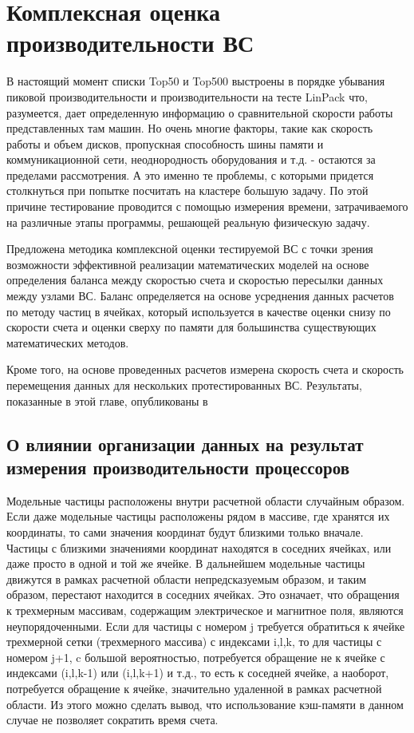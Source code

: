 \chapter{Комплексная оценка производительности ВС}



В настоящий момент списки Top50 и Top500
выстроены в порядке убывания пиковой производительности и производительности на тесте LinPack что, разумеется, дает определенную информацию
о сравнительной скорости работы представленных там машин. Но очень многие факторы, такие как скорость работы и объем дисков, пропускная 
способность шины памяти и коммуникационной сети, неоднородность оборудования и т.д. - остаются за пределами рассмотрения. А это именно те 
проблемы, с которыми придется столкнуться при попытке посчитать на кластере большую задачу. По этой причине тестирование проводится с помощью измерения времени, затрачиваемого на различные этапы программы, решающей реальную физическую задачу.




Предложена методика комплексной оценки тестируемой ВС с точки зрения возможности эффективной реализации математических моделей на основе определения баланса между скоростью счета и скоростью пересылки данных между узлами ВС. Баланс определяется на основе усреднения данных расчетов по методу частиц в ячейках, который используется в качестве оценки снизу по скорости счета и оценки сверху по памяти для большинства существующих математических методов.

Кроме того, на основе проведенных расчетов измерена скорость счета и скорость перемещения данных для нескольких протестированных ВС. Результаты, показанные в этой главе, опубликованы в \cite{VestnikNNSU,NumMethMultiLevel,SuperFrI,integrApproach}   

		


\section{О влиянии организации данных на результат измерения производительности процессоров}
\label{procs_influence}

Модельные частицы расположены внутри расчетной области случайным образом. Если даже модельные частицы расположены рядом в массиве, где хранятся их координаты,  то сами значения координат будут близкими только вначале. Частицы с близкими значениями координат находятся в соседних ячейках, или даже просто в одной и той же ячейке. В дальнейшем модельные частицы движутся в рамках расчетной области непредсказуемым образом, и таким образом, перестают находится в соседних ячейках. Это означает, что обращения к трехмерным массивам, содержащим электрическое и магнитное поля, являются неупорядоченными. Если для частицы с номером j требуется обратиться к ячейке трехмерной сетки (трехмерного массива) с индексами i,l,k, то для частицы с номером j+1, c большой вероятностью, потребуется обращение не к ячейке с индексами (i,l,k-1) или (i,l,k+1) и т.д., то есть к соседней ячейке, а наоборот, потребуется обращение к ячейке, значительно удаленной в рамках расчетной области. 
Из этого можно сделать вывод, что использование кэш-памяти в данном случае не позволяет сократить время счета. 

